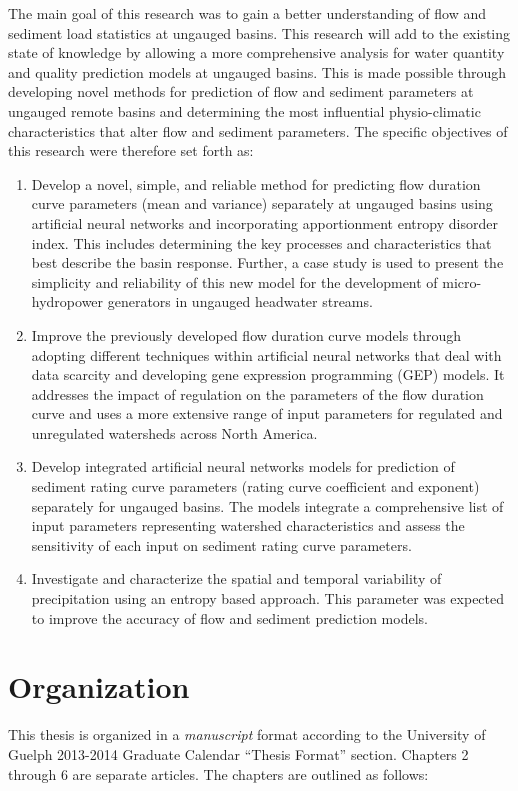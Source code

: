 The main goal of this research was to gain a better understanding of flow and sediment load statistics at ungauged basins. This research will add to the existing state of knowledge by allowing a more comprehensive analysis for water quantity and quality prediction models at ungauged basins.  This is made possible through developing novel methods for prediction of flow and sediment parameters at ungauged remote basins and determining the most influential physio-climatic characteristics that alter flow and sediment parameters. The specific objectives of this research were therefore set forth as:

\begin{enumerate}
\item Develop a novel, simple, and reliable method for predicting flow duration curve parameters (mean and variance) separately at ungauged basins using artificial neural networks and incorporating apportionment entropy disorder index. This includes determining the key processes and characteristics that best describe the basin response. Further, a case study is used to present the simplicity and reliability of this new model for the development of micro-hydropower generators in ungauged headwater streams.
\item Improve the previously developed flow duration curve models through adopting different techniques within artificial neural networks that deal with data scarcity and developing gene expression programming (GEP) models. It addresses the impact of regulation on the parameters of the flow duration curve and uses a more extensive range of input parameters for regulated and unregulated watersheds across North America.
\item Develop integrated artificial neural networks models for prediction of sediment rating curve parameters (rating curve coefficient and exponent) separately  for ungauged basins. The models integrate a comprehensive list of input parameters representing watershed characteristics and assess the sensitivity of each input on sediment rating curve parameters. 
\item Investigate and characterize the spatial and temporal variability of precipitation using an entropy based approach. This parameter was expected to improve the accuracy of flow and sediment prediction models.
\end{enumerate}

\section{Organization}
This thesis is organized in a \textit{manuscript} format according to the University of Guelph 2013-2014 Graduate Calendar ``Thesis Format'' section.  Chapters 2 through 6 are separate articles. The chapters are outlined as follows:

